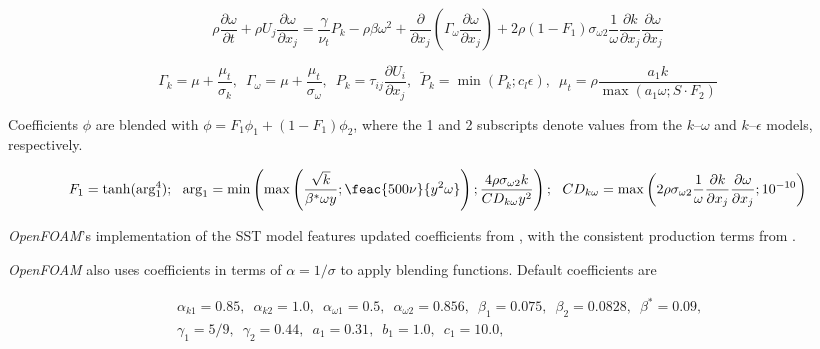 \begin{equation}
    \rho \frac{\partial \omega}{\partial t}
    + \rho U_j \frac{\partial \omega}{\partial x_j}
    = \frac{\gamma}{\nu_t} P_k - \rho \beta \omega^2
    + \frac{\partial}{\partial x_j}
    \left(
    \Gamma_\omega \frac{\partial \omega}{\partial x_j}
    \right)
    + 2 \rho (1 - F_1) \sigma_{\omega 2}
    \frac{1}{\omega} \frac{\partial k}{\partial x_j}
    \frac{\partial \omega}{\partial x_j}
\end{equation}

\begin{equation}
    \Gamma_k = \mu + \frac{\mu_t}{\sigma_k}, \, \, \,
    \Gamma_\omega = \mu + \frac{\mu_t}{\sigma_\omega}, \, \, \,
    P_k = \tau_{ij} \frac{\partial U_i}{\partial x_j}, \, \, \,
    \tilde{P}_k = \min(P_k;c_l \epsilon), \, \, \,
    \mu_t = \rho \frac{a_1 k}{\max(a_1 \omega; S \cdot F_2)}
\end{equation}

Coefficients $\phi$ are blended with $\phi = F_1 \phi_1 + (1 - F_1) \phi_2$,
where the 1 and 2 subscripts denote values from the $k$--$\omega$ and
$k$--$\epsilon$ models, respectively.

\begin{equation}
    F_1 = \tanh (\arg_1^4); \, \, \, \,
    \arg_1 = \min
    \left(
    \max
    \left(
    \frac{\sqrt{k}}{\beta^* \omega y};
    \feac{500 \nu}{y^2 \omega}
    \right);
    \frac{4 \rho \sigma_{\omega2} k}{CD_{k \omega} y^2}
    \right); \, \, \, \,
    CD_{k \omega} = \max
    \left(
    2 \rho \sigma_{\omega 2} \frac{1}{\omega}
    \frac{\partial k}{\partial x_j}
    \frac{\partial \omega}{\partial x_j};
    10^{-10}
    \right)
\end{equation}

\textit{OpenFOAM}'s implementation of the SST model features updated
coefficients from \cite{Menter2003}, with the consistent production terms from
\cite{Menter2001}.

\textit{OpenFOAM} also uses coefficients in terms of $\alpha = 1/\sigma$ to
apply blending functions. Default coefficients are

\begin{equation}
\begin{split}
&   \alpha_{k1} = 0.85, \, \, \,
    \alpha_{k2} = 1.0, \, \, \,
    \alpha_{\omega1} = 0.5, \, \, \,
    \alpha_{\omega2} = 0.856, \, \, \,
    \beta_1 = 0.075, \, \, \,
    \beta_2 = 0.0828, \, \, \,
    \beta^* = 0.09, \, \, \, \\
&   \gamma_1 = 5/9, \, \, \,
    \gamma_2 = 0.44, \, \, \,
    a_1 = 0.31, \, \, \,
    b_1 = 1.0, \, \, \,
    c_1 = 10.0, \, \, \,
\end{split}
\end{equation}



